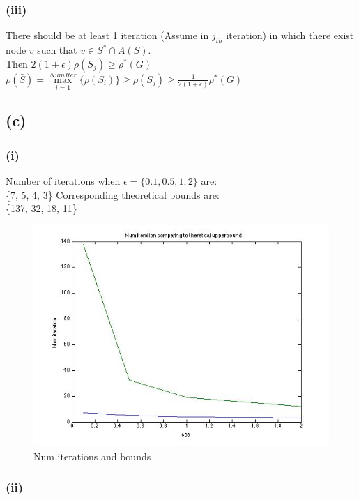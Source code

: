 \documentclass{article}
\begin{document}
 \subsubsection{(iii)}
There should be at least 1 iteration (Assume in $j_{th}$ iteration) in which there exist node $v$ such that $v \in S^* \cap A(S)$. \\
Then $2(1+\epsilon)\rho(S_j) \ge \rho^*(G)$ \\
$\rho(\bar S) = \max\limits_{i=1}^{Num Iter}\{ \rho(S_i)\} \ge \rho(S_j) \ge \frac{1}{2(1+\epsilon)}\rho^*(G)$

 \subsection{(c)}
  \subsubsection{(i)}
 Number of iterations when $\epsilon = \{0.1, 0.5, 1, 2\}$ are: \\
  \{7, 5, 4, 3\}
 Corresponding theoretical bounds are: \\
 \{137, 32, 18, 11\}
 

   \begin{figure}[H]
\centering
\includegraphics[scale=0.5]{q4-NumIterations.jpg}
\caption{ Num iterations and bounds }
\label{}
\end{figure}

\subsubsection{(ii)}
\end{document}
